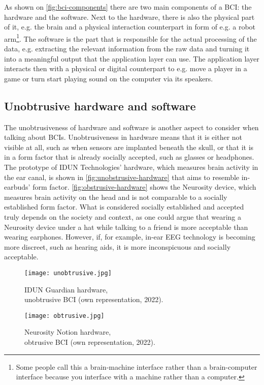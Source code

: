 As shown on \autoref{fig:bci-components} there are two main components of a BCI: the hardware and the software. Next to the hardware, there is also the physical part of it, e.g. the brain and a physical interaction counterpart in form of e.g. a robot arm\footnote{Some people call this a brain-machine interface rather than a brain-computer interface because you interface with a machine rather than a computer.}. The software is the part that is responsible for the actual processing of the data, e.g. extracting the relevant information from the raw data and turning it into a meaningful output that the application layer can use. The application layer interacts then with a physical or digital counterpart to e.g. move a player in a game or turn start playing sound on the computer via its speakers.

\subsection{Unobtrusive hardware and software}
\label{chapter2-unobtrusive-hardware-and-software}

The unobtrusiveness of hardware and software is another aspect to consider when talking about BCIs. Unobtrusiveness in hardware means that it is either not visible at all, such as when sensors are implanted beneath the skull, or that it is in a form factor that is already socially accepted, such as glasses or headphones. The prototype of IDUN Technologies' hardware, which measures brain activity in the ear canal, is shown in  \autoref{fig:unobstrusive-hardware} that aims to resemble in-earbuds' form factor. \autoref{fig:obstrusive-hardware} shows the Neurosity device, which measures brain activity on the head and is not comparable to a socially established form factor. What is considered socially established and accepted truly depends on the society and context, as one could argue that wearing a Neurosity device under a hat while talking to a friend is more acceptable than wearing earphones. However, if, for example, in-ear EEG technology is becoming more discreet, such as hearing aids, it is more inconspicuous and socially acceptable.

\begin{figure}[!htb]
  \texttt{[image: unobtrusive.jpg]}
  \caption{IDUN Guardian hardware, \\ unobtrusive BCI (own representation, 2022).}
  \label{fig:unobstrusive-hardware}
  \endminipage\hfill
  \texttt{[image: obtrusive.jpg]}
  \caption{Neurosity Notion hardware, \\ obtrusive BCI (own representation, 2022).}
  \label{fig:obstrusive-hardware}
  \endminipage\hfill
\end{figure}

